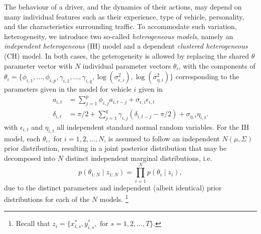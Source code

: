 \documentclass[12pt,a4paper]{article}\usepackage[]{graphicx}\usepackage[]{color}
\begin{document}
The behaviour of a driver, and the dynamics of their actions, may depend on many individual features such as their experience, type of vehicle, personality, and the characteristics surrounding traffic. To accommodate such variation, heterogeneity, we introduce two so-called \textit{heterogeneous models}, namely an \textit{independent heterogeneous} (IH) model and a dependent \textit{clustered heterogeneous} (CH) model. In both cases, the geterogeneity is allowed by replacing the shared $\theta$ parameter vector with $N$ individual parameter vectors $\theta_i$, with the components of $\theta_i=\{\phi_{i,1}, \dots, \phi_{i,p}, \gamma_{i,1}, \dots, \gamma_{i,q}, \log(\sigma^{2}_{\epsilon,i}), \log(\sigma^{2}_{\eta,i})\}$ corresponding to the parameters given in the model for vehicle $i$ given in
\begin{align}
a_{i, t} &= \sum_{j = 1}^p \phi_{i, j} a_{i, t-j} + \sigma_{\epsilon, i} \epsilon_{i, t} \label{aAR2} \\
\delta_{i, t} &= \pi/2 + \sum_{j = 1}^q \gamma_{i, j} (\delta_{i, t-j} - \pi/2) + \sigma_{\eta, i} \eta_{i, t}. \label{dAR2}
\end{align}
with $\epsilon_{i,t}$ and $\eta_{i,t}$ all independent standard normal random variables. For the IH model, each $\theta_i,$ for $i=1,2,\ldots, N$, is assumed to follow an independent $N(\mu, \Sigma)$ prior distribution, resulting in a joint posterior distribution that may be decomposed into $N$ distinct independent marginal distributions, i.e.
\begin{equation}
p(\theta_{1:N} \mid z_{1:N}) = \prod_{i=1}^N p(\theta_{i} \mid z_{i}),
\end{equation}
due to the distinct parameters and independent (albeit identical) prior distributions for each of the $N$ models. \footnote{Recall that $z_{i}=\{x^*_{i,s},y^*_{i,s},\mbox{ for } s=1,2,...,T \}$.}
\\
\end{document}
